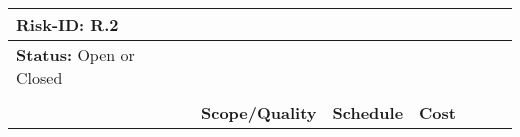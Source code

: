 \begin{table}[H]
\begin{tabular}
			\\ 
		
		\hline

		
	\end{tabular}
	\caption{Risk 1 data sheet}
\end{table}

\begin{table}[H]
	\centering
	\begin{tabular}{| >{\raggedright\arraybackslash}p{1.8cm} | >{\raggedright\arraybackslash}p{2.4cm} | >{\raggedright\arraybackslash}p{1.6cm} | >{\raggedright\arraybackslash}p{1cm} | >{\raggedright\arraybackslash}p{1.3cm} | >{\raggedright\arraybackslash}p{1.9cm} | >{\raggedright\arraybackslash}p{2cm} |}
		
		\hline
		
		\textbf{Risk-ID:} \newline R.2	&	\multicolumn{6}{| >{\raggedright\arraybackslash}p{11.6cm} |}{\textbf{Risk Description:} \newline Inaccurate cost forecast: The financial predictions could be wrong or different issues may occur increasing the total cost of the project.}	\\ 
		
		\hline
		
		\textbf{Status:} \newline Open or Closed	&	\multicolumn{6}{| >{\raggedright\arraybackslash}p{11.6cm} |}{\textbf{Risk Cause:} \newline Description of the circumstances or drivers that are the source of the risk}	\\ 
		
		\hline

		\multirow{2}{*}{\textbf{Probability}} 	&	\multicolumn{3}{| >{\raggedright\arraybackslash}p{4.5cm} |}{\textbf{Impact}}  &  \multirow{2}{*}{ \textbf{Score}}  &   \multicolumn{2}{| >{\raggedright\arraybackslash}p{4cm} |}{\multirow{2}{*}{\textbf{Responses}}}  \\ 
		
		\cline{2-4}

		\multirow{2}{*}{} &  \textbf{Scope/Quality}  &   \textbf{Schedule}  &   \textbf{Cost}  &    \multirow{2}{*}{}  &\multicolumn{2}{| >{\raggedright\arraybackslash}p{4cm} |}{\multirow{2}{*}{}}   \\  


\end{tabular}
\end{table}

